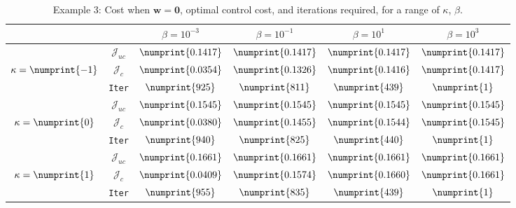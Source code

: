 \begin{table}
\begin{tabular}{ | c | c || c | c | c | c ||}
\hline
\multicolumn{2}{|c||}{}& $\beta = 10^{-3}$ & $\beta = 10^{-1}$ & $\beta = 10^{1}$ & $\beta = 10^{3}$  \\
\hline
\hline
 & $\mathcal{J}_{uc}$ & $\numprint{0.1417}$ & $\numprint{0.1417}$ & $\numprint{0.1417}$ & $\numprint{0.1417}$ \\
$\kappa= \numprint{-1}$  & $\mathcal{J}_c$ & $\numprint{0.0354}$ & $\numprint{0.1326}$ & $\numprint{0.1416}$ & $\numprint{0.1417}$ \\
& \texttt{Iter} & $\numprint{925}$ & $\numprint{811}$ & $\numprint{439}$ & $\numprint{1}$ \\
\hline
 & $\mathcal{J}_{uc}$ & $\numprint{0.1545}$ & $\numprint{0.1545}$ & $\numprint{0.1545}$ & $\numprint{0.1545}$ \\
$\kappa= \numprint{0}$  & $\mathcal{J}_c$ & $\numprint{0.0380}$ & $\numprint{0.1455}$ & $\numprint{0.1544}$ & $\numprint{0.1545}$ \\
& \texttt{Iter} & $\numprint{940}$ & $\numprint{825}$ & $\numprint{440}$ & $\numprint{1}$ \\
\hline
 & $\mathcal{J}_{uc}$ & $\numprint{0.1661}$ & $\numprint{0.1661}$ & $\numprint{0.1661}$ & $\numprint{0.1661}$ \\
$\kappa= \numprint{1}$  & $\mathcal{J}_c$ & $\numprint{0.0409}$ & $\numprint{0.1574}$ & $\numprint{0.1660}$ & $\numprint{0.1661}$ \\
& \texttt{Iter} & $\numprint{955}$ & $\numprint{835}$ & $\numprint{439}$ & $\numprint{1}$ \\
\hline
\end{tabular}
\caption{Example 3: Cost when $\mathbf{w}=\mathbf{0}$, optimal control cost, and iterations required, for a range of $\kappa$, $\beta$.}
\label{TabS5:Prob3}
\end{table}